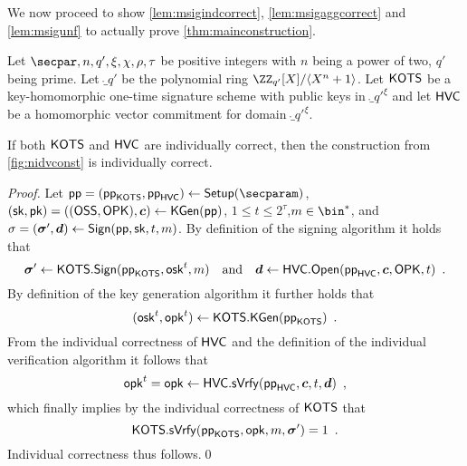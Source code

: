 \bigskip\noindent
We now proceed to show \autoref{lem:msigindcorrect}, \autoref{lem:msigaggcorrect} and \autoref{lem:msigunf} to actually prove \autoref{thm:mainconstruction}.
\begin{lemma}\label{lem:msigindcorrect}
Let $\secpar,n,q',\xi,\chi,\rho,\tau$ be positive integers with $n$ being a power of two, $q'$ being prime.
Let $\ring_{q'}$ be the polynomial ring $\defringqq$.
Let $\mathsf{KOTS}$ be a key-homomorphic one-time signature scheme with public keys in $\ring_{q'}^\xi$ and let $\mathsf{HVC}$ be a homomorphic vector commitment for domain $\ring_{q'}^\xi$.

If both $\mathsf{KOTS}$ and $\mathsf{HVC}$ are individually correct, then the construction from \autoref{fig:nidvconst} is individually correct.
\end{lemma}
\begin{proof}
  Let $\params=(\hotsparams,\hvcparams)\gets\setup(\secparam)$, $(\mathsf{sk},\mathsf{pk}) = ((\mathsf{OSS},\mathsf{OPK}),\boldsymbol{c})\gets\mathsf{KGen}(\mathsf{pp})$, $1\leq t\leq 2^\tau$,$m\in\bin^*$, and $\sigma = (\boldsymbol{\sigma}',\boldsymbol{d}) \gets \mathsf{Sign}(\mathsf{pp},\mathsf{sk},t,m)$.
  By definition of the signing algorithm it holds that
  \[
    \boldsymbol{\sigma}' \gets \mathsf{KOTS}.\mathsf{Sign}(\mathsf{pp}_{\mathsf{KOTS}},\mathsf{osk}^t,m) \quad \text{and} \quad \boldsymbol{d} \gets \mathsf{HVC}.\mathsf{Open}(\mathsf{pp}_{\mathsf{HVC}},\boldsymbol{c},\mathsf{OPK},t)\enspace{}.
  \]
  By definition of the key generation algorithm it further holds that
  \[
    (\mathsf{osk}^t,\mathsf{opk}^t) \gets \mathsf{KOTS}.\mathsf{KGen}(\mathsf{pp}_{\mathsf{KOTS}})\enspace.
  \]
  From the individual correctness of $\mathsf{HVC}$ and the definition of the individual verification algorithm it follows that
  \[
    \mathsf{opk}^t = \mathsf{opk} \gets \mathsf{HVC}.\mathsf{sVrfy}(\mathsf{pp}_{\mathsf{HVC}},\boldsymbol{c},t,\boldsymbol{d})\enspace,
  \]
  which finally implies by the individual correctness of $\mathsf{KOTS}$ that
  \[
    \mathsf{KOTS}.\mathsf{sVrfy}(\mathsf{pp}_{\mathsf{KOTS}},\mathsf{opk},m,\boldsymbol{\sigma}') = 1\enspace.
  \]
  Individual correctness thus follows.\qed
\end{proof}

